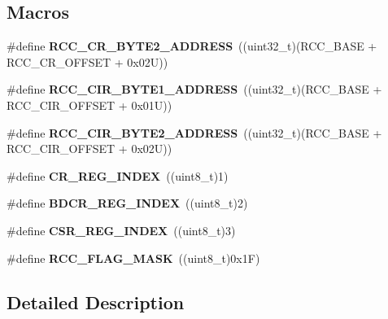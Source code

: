 \subsection*{Macros}
\begin{DoxyCompactItemize}
\item 
\mbox{\label{group___r_c_c___private___constants_ga1da336203f39dd57462e7f331271f699}} 
\#define {\bfseries R\+C\+C\+\_\+\+C\+R\+\_\+\+B\+Y\+T\+E2\+\_\+\+A\+D\+D\+R\+E\+SS}~((uint32\+\_\+t)(R\+C\+C\+\_\+\+B\+A\+SE + R\+C\+C\+\_\+\+C\+R\+\_\+\+O\+F\+F\+S\+ET + 0x02\+U))
\item 
\mbox{\label{group___r_c_c___private___constants_ga97f80d22ba3506a43accbeb9ceb31f51}} 
\#define {\bfseries R\+C\+C\+\_\+\+C\+I\+R\+\_\+\+B\+Y\+T\+E1\+\_\+\+A\+D\+D\+R\+E\+SS}~((uint32\+\_\+t)(R\+C\+C\+\_\+\+B\+A\+SE + R\+C\+C\+\_\+\+C\+I\+R\+\_\+\+O\+F\+F\+S\+ET + 0x01\+U))
\item 
\mbox{\label{group___r_c_c___private___constants_ga1387fb2dfadb830eb83ab2772c8d2294}} 
\#define {\bfseries R\+C\+C\+\_\+\+C\+I\+R\+\_\+\+B\+Y\+T\+E2\+\_\+\+A\+D\+D\+R\+E\+SS}~((uint32\+\_\+t)(R\+C\+C\+\_\+\+B\+A\+SE + R\+C\+C\+\_\+\+C\+I\+R\+\_\+\+O\+F\+F\+S\+ET + 0x02\+U))
\item 
\mbox{\label{group___r_c_c___private___constants_ga56feb1abcd35b22427fa55164c585afa}} 
\#define {\bfseries C\+R\+\_\+\+R\+E\+G\+\_\+\+I\+N\+D\+EX}~((uint8\+\_\+t)1)
\item 
\mbox{\label{group___r_c_c___private___constants_ga114b3e5b2a2cdb5d85f65511fe085a6d}} 
\#define {\bfseries B\+D\+C\+R\+\_\+\+R\+E\+G\+\_\+\+I\+N\+D\+EX}~((uint8\+\_\+t)2)
\item 
\mbox{\label{group___r_c_c___private___constants_gab9507f2d9ee5d477b11363b052cd07c8}} 
\#define {\bfseries C\+S\+R\+\_\+\+R\+E\+G\+\_\+\+I\+N\+D\+EX}~((uint8\+\_\+t)3)
\item 
\mbox{\label{group___r_c_c___private___constants_ga80017c6bf8a5c6f53a1a21bb8db93a82}} 
\#define {\bfseries R\+C\+C\+\_\+\+F\+L\+A\+G\+\_\+\+M\+A\+SK}~((uint8\+\_\+t)0x1\+F)
\end{DoxyCompactItemize}


\subsection{Detailed Description}
